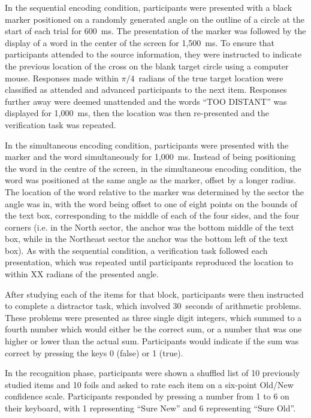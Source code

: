 \documentclass[10pt, a4paper, man, biblatex]{apa6}
\begin{document}
In the sequential encoding condition, participants were presented with a black marker positioned on a randomly generated angle on the outline of a circle at the start of each trial for 600~ms. The presentation of the marker was followed by the display of a word in the center of the screen for 1,500~ms. To ensure that participants attended to the source information, they were instructed to indicate the previous location of the cross on the blank target circle using a computer mouse. Responses made within $\pi/4$~radians of the true target location were classified as attended and advanced participants to the next item. Responses further away were deemed unattended and the words ``TOO DISTANT'' was displayed for 1,000~ms, then the location was then re-presented and the verification task was repeated.

In the simultaneous encoding condition, participants were presented with the marker and the word simultaneously for 1,000~ms. Instead of being positioning the word in the centre of the screen, in the simultaneous encoding condition, the word was positioned at the same angle as the marker, offset by a longer radius. The location of the word relative to the marker was determined by the sector the angle was in, with the word being offset to one of eight points on the bounds of the text box, corresponding to the middle of each of the four sides, and the four corners (i.e. in the North sector, the anchor was the bottom middle of the text box, while in the Northeast sector the anchor was the bottom left of the text box). As with the sequential condition, a verification task followed each presentation, which was repeated until participants reproduced the location to within XX radians of the presented angle.

After studying each of the items for that block, participants were then instructed to complete a distractor task, which involved 30~seconds of arithmetic problems. These problems were presented as three single digit integers, which summed to a fourth number which would either be the correct sum, or a number that was one higher or lower than the actual sum. Participants would indicate if the sum was correct by pressing the keys 0 (false) or 1 (true).

In the recognition phase, participants were shown a shuffled list of 10 previously studied items and 10 foils and asked to rate each item on a six-point Old/New confidence scale. Participants responded by pressing a number from 1 to 6 on their keyboard, with 1 representing ``Sure New'' and 6 representing ``Sure Old''.
\end{document}
